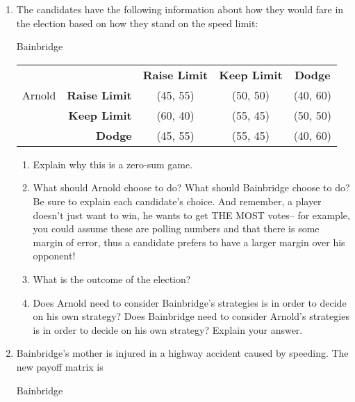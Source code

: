 \begin{enumerate}
\item The candidates have the following information about how they would fare in the election based on how they stand on the speed limit:
\vspace{.1in}

\hspace{2in}Bainbridge

\begin{tabular}{l|r|c|c|c|}\cline{2-5}
&&\textbf{Raise Limit}&\textbf{Keep Limit}&\textbf{Dodge}\\ \cline{2-5}
Arnold&\textbf{Raise Limit} &(45, 55)&(50, 50)&(40, 60)\\ \cline{2-5}
&\textbf{Keep Limit} &(60, 40)&(55, 45)&(50, 50)\\ \cline{2-5}
&\textbf{Dodge} &(45, 55)&(55, 45)&(40, 60)\\ \cline{2-5}
\end{tabular}
\vspace{.1in}

\begin{enumerate}
\item Explain why this is a zero-sum game.

\item What should Arnold choose to do? What should Bainbridge choose to do? Be sure to explain each candidate's choice. And remember, a player doesn't just want to win, he wants to get THE MOST votes-- for example, you could assume these are polling numbers and that there is some margin of error, thus a candidate prefers to have a larger margin over his opponent!


\item What is the outcome of the election?
\item Does Arnold need to consider Bainbridge's strategies is in order to decide on his own strategy? Does Bainbridge need to consider Arnold's strategies is in order to decide on his own strategy? Explain your answer.

\end{enumerate}

\vspace{.1in}

\item Bainbridge's mother is injured in a highway accident caused by speeding. The new payoff matrix is

\vspace{.1in}

\hspace{2in}Bainbridge


\end{enumerate}
